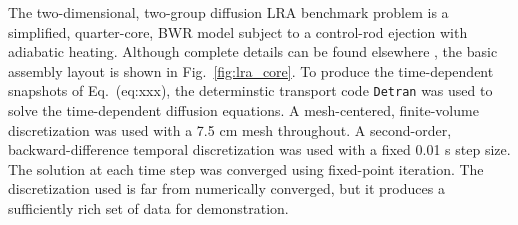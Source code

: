 \documentclass{anstrans}
\begin{document}
The two-dimensional, two-group diffusion LRA benchmark problem is a simplified, quarter-core, BWR model subject to a control-rod ejection with adiabatic heating.
Although complete details can be found elsewhere \cite{}, the basic assembly layout is shown in Fig.~\ref{fig:lra_core}.
To produce the time-dependent snapshots of Eq.~({eq:xxx}), the determinstic transport code {\tt Detran} \cite{} was used to solve the time-dependent diffusion equations.  
A mesh-centered, finite-volume discretization was used with a 7.5 cm mesh throughout.
A second-order, backward-difference temporal discretization was used with a fixed 0.01 s step size.  
The solution at each time step was converged using fixed-point iteration.
The discretization used is far from numerically converged, but it produces a sufficiently rich set of data for demonstration.
\end{document}
